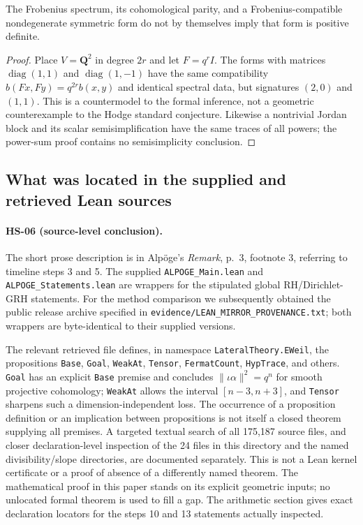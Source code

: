 \begin{proposition}
The Frobenius spectrum, its cohomological parity, and a Frobenius-compatible
nondegenerate symmetric form do not by themselves imply that form is
positive definite.
\end{proposition}
\begin{proof}
Place $V=\mathbf Q^2$ in degree $2r$ and let $F=q^r I$.
The forms with matrices $\operatorname{diag}(1,1)$ and
$\operatorname{diag}(1,-1)$ have the same compatibility
$b(Fx,Fy)=q^{2r}b(x,y)$ and identical spectral data, but signatures
$(2,0)$ and $(1,1)$.  This is a countermodel to the formal inference,
not a geometric counterexample to the Hodge standard conjecture.
Likewise a nontrivial Jordan block and its scalar semisimplification
have the same traces of all powers; the power-sum proof contains no
semisimplicity conclusion.
\end{proof}

\subsection{What was located in the supplied and retrieved Lean sources}
\label{sec:lean}
\paragraph{HS-06 (source-level conclusion).}
The short prose description is in Alp\"oge's \emph{Remark}, p.~3,
footnote 3, referring to timeline steps 3 and 5.  The supplied
\texttt{ALPOGE\_Main.lean} and \texttt{ALPOGE\_Statements.lean} are
wrappers for the stipulated global RH/Dirichlet-GRH statements.
For the method comparison we subsequently obtained the public release
archive specified in \texttt{evidence/LEAN\_MIRROR\_PROVENANCE.txt}; both
wrappers are byte-identical to their supplied versions.

The relevant retrieved file
defines, in namespace \texttt{LateralTheory.EWeil}, the propositions
\texttt{Base}, \texttt{Goal}, \texttt{WeakAt}, \texttt{Tensor},
\texttt{FermatCount}, \texttt{HypTrace}, and others.
\texttt{Goal} has an explicit \texttt{Base} premise and concludes
$\|\iota\alpha\|^2=q^n$ for smooth projective cohomology;
\texttt{WeakAt} allows the interval $[n-3,n+3]$, and
\texttt{Tensor} sharpens such a dimension-independent loss.
The occurrence of a proposition definition or an implication between
propositions is not itself a closed theorem supplying all premises.
A targeted textual search of all 175,187 source files, and closer
declaration-level inspection of the 24 files in this directory and
the named divisibility/slope directories, are documented separately.
This is not a Lean kernel certificate or a proof of absence of a differently
named theorem.  The mathematical proof in this paper stands on its
explicit geometric inputs; no unlocated formal theorem is used to fill
a gap.  The arithmetic section gives exact declaration locators for the
steps 10 and 13 statements actually inspected.
